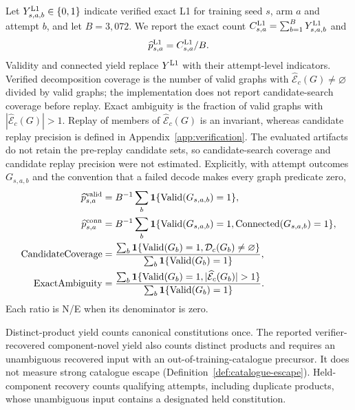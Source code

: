 \documentclass{article}
\theoremstyle{definition}
\newcommand{\ForgeProseAttemptsPerProgram}{3{,}072}
\begin{document}
Let $Y_{s,a,b}^{\rm L1}\in\{0,1\}$ indicate verified exact L1 for training seed $s$, arm $a$ and
attempt $b$, and let $B=\ForgeProseAttemptsPerProgram$. We report the exact count
$C_{s,a}^{\rm L1}=\sum_{b=1}^B Y_{s,a,b}^{\rm L1}$ and
\begin{equation}
 \widehat p_{s,a}^{\rm L1}=C_{s,a}^{\rm L1}/B.
\end{equation}
Validity and connected yield replace $Y^{\rm L1}$ with their attempt-level indicators. Verified
decomposition coverage is the number of valid graphs with
$\widehat{\mathcal E}_c(G)\neq\varnothing$ divided by valid graphs; the implementation does not
report candidate-search coverage before replay. Exact ambiguity is the fraction of valid graphs with
$|\widehat{\mathcal E}_c(G)|>1$. Replay of members of $\widehat{\mathcal E}_c(G)$ is an invariant,
whereas candidate replay precision is defined in Appendix~\ref{app:verification}. The evaluated
artifacts do not retain the pre-replay candidate sets, so candidate-search coverage and candidate
replay precision were not estimated.
Explicitly, with attempt outcomes $G_{s,a,b}$ and the convention that a failed decode makes every
graph predicate zero,
\begin{align}
 \widehat p^{\rm valid}_{s,a}
 &=B^{-1}\sum_b\mathbf 1\{\mathrm{Valid}(G_{s,a,b})=1\},\\
 \widehat p^{\rm conn}_{s,a}
 &=B^{-1}\sum_b\mathbf 1\{\mathrm{Valid}(G_{s,a,b})=1,
                              \mathrm{Connected}(G_{s,a,b})=1\},\\
 \mathrm{CandidateCoverage}
 &=\frac{\sum_b\mathbf 1\{\mathrm{Valid}(G_b)=1,
                              \mathcal D_c(G_b)\neq\varnothing\}}
         {\sum_b\mathbf 1\{\mathrm{Valid}(G_b)=1\}},\\
 \mathrm{ExactAmbiguity}
 &=\frac{\sum_b\mathbf 1\{\mathrm{Valid}(G_b)=1,
                              |\widehat{\mathcal E}_c(G_b)|>1\}}
         {\sum_b\mathbf 1\{\mathrm{Valid}(G_b)=1\}}.
\end{align}
Each ratio is N/E when its denominator is zero.

Distinct-product yield counts canonical constitutions once. The reported verifier-recovered
component-novel yield also counts distinct products and requires an unambiguous recovered input
with an out-of-training-catalogue precursor. It does not measure strong catalogue escape
(Definition~\ref{def:catalogue-escape}). Held-component recovery counts qualifying attempts,
including duplicate products, whose unambiguous input contains a designated held constitution.
\end{document}
